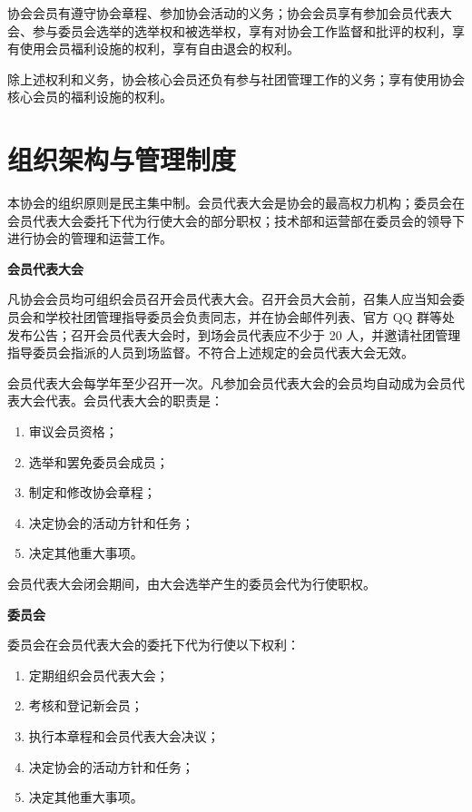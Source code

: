 	\term 协会会员有遵守协会章程、参加协会活动的义务；协会会员享有参加会员代表大会、参与委员会选举的选举权和被选举权，享有对协会工作监督和批评的权利，享有使用会员福利设施的权利，享有自由退会的权利。
	
	除上述权利和义务，协会核心会员还负有参与社团管理工作的义务；享有使用协会核心会员的福利设施的权利。
	
	\section{组织架构与管理制度}
	
	\term 本协会的组织原则是民主集中制。会员代表大会是协会的最高权力机构；委员会在会员代表大会委托下代为行使大会的部分职权；技术部和运营部在委员会的领导下进行协会的管理和运营工作。
	
	\term \textbf{会员代表大会}
	
	凡协会会员均可组织会员召开会员代表大会。召开会员大会前，召集人应当知会委员会和学校社团管理指导委员会负责同志，并在协会邮件列表、官方 QQ 群等处发布公告；召开会员代表大会时，到场会员代表应不少于 20 人，并邀请社团管理指导委员会指派的人员到场监督。不符合上述规定的会员代表大会无效。
	
	会员代表大会每学年至少召开一次。凡参加会员代表大会的会员均自动成为会员代表大会代表。会员代表大会的职责是：
	
	\begin{enumerate}
		\item 审议会员资格；
		\item 选举和罢免委员会成员；
		\item 制定和修改协会章程；
		\item 决定协会的活动方针和任务；
		\item 决定其他重大事项。
	\end{enumerate}
	
	会员代表大会闭会期间，由大会选举产生的委员会代为行使职权。
	
	\term \textbf{委员会}
	
	委员会在会员代表大会的委托下代为行使以下权利：
	
	\begin{enumerate}
		\item 定期组织会员代表大会；
		\item 考核和登记新会员；
		\item 执行本章程和会员代表大会决议；
		\item 决定协会的活动方针和任务；
		\item 决定其他重大事项。
	\end{enumerate}
	
